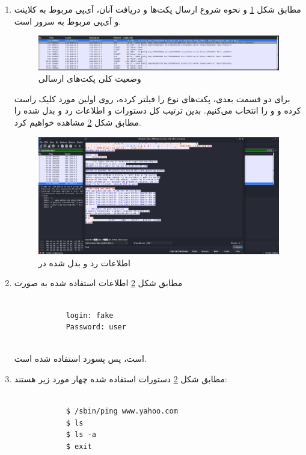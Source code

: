 \documentclass[12pt]{article}
\begin{document}
\begin{enumerate}
	
	\item
	مطابق شکل
	\ref{s8}
	و نحوه شروع ارسال پکت‌ها و دریافت آنان،
	آی‌پی مربوط به کلاینت
	و آی‌پی مربوط به سرور
	است.
	
	\begin{figure}[H]
		\centering
		\includegraphics[scale=0.25]{images/8.png}
		\caption{وضعیت کلی پکت‌های ارسالی } 
		\label{s8}
	\end{figure}
	
	

	برای دو قسمت بعدی، پکت‌های نوع
	را فیلتر کرده، روی اولین مورد کلیک راست کرده و  و 
	را انتخاب می‌کنیم. بدین ترتیب کل دستورات و اطلاعات رد و بدل شده را مطابق شکل 
	\ref{s9}
	مشاهده خواهیم کرد.
	
		
	\begin{figure}[H]
		\centering
		\includegraphics[scale=0.25]{images/9.png}
		\caption{اطلاعات رد و بدل شده در } 
		\label{s9}
	\end{figure}
	
	\item
	مطابق شکل
	\ref{s9}
	اطلاعات استفاده شده به صورت
	\begin{latin}
		\begin{verbatim}
			
			login: fake
			Password: user
			
		\end{verbatim}
	\end{latin}

	است، پس پسورد استفاده شده
	است.
	
	\item
 	مطابق شکل
	\ref{s9}
	دستورات استفاده شده چهار مورد زیر هستند:
	
	\begin{latin}
		\begin{verbatim}
			
			$ /sbin/ping www.yahoo.com
			$ ls
			$ ls -a
			$ exit
			
		\end{verbatim}
	\end{latin}
	
\end{enumerate}
\end{document}
